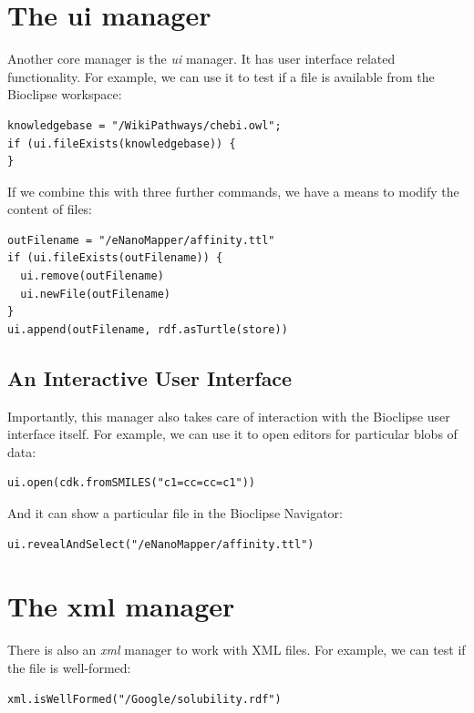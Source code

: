 \documentclass[a5paper, 10pt]{memoir}
\begin{document}
\begin{refsection}
\section{The ui manager}

Another core manager is the \emph{ui} manager. It has user interface related
functionality. For example, we can use it to test if a file is available from
the Bioclipse workspace:

\begin{Verbatim}
knowledgebase = "/WikiPathways/chebi.owl";
if (ui.fileExists(knowledgebase)) {
}
\end{Verbatim}

If we combine this with three further commands, we have a means to modify the
content of files:
\begin{Verbatim}
outFilename = "/eNanoMapper/affinity.ttl"
if (ui.fileExists(outFilename)) {
  ui.remove(outFilename)
  ui.newFile(outFilename)
}
ui.append(outFilename, rdf.asTurtle(store))
\end{Verbatim}

\subsection{An Interactive User Interface}

Importantly, this manager also takes care of interaction with the Bioclipse
user interface itself. For example, we can use it to open editors for
particular blobs of data:

\begin{Verbatim}
ui.open(cdk.fromSMILES("c1=cc=cc=c1"))
\end{Verbatim}

And it can show a particular file in the Bioclipse Navigator:
\begin{Verbatim}
ui.revealAndSelect("/eNanoMapper/affinity.ttl")
\end{Verbatim}

\section{The xml manager}

There is also an \emph{xml} manager to work with XML files. For example, we can test if the
file is well-formed:
\begin{Verbatim}
xml.isWellFormed("/Google/solubility.rdf")
\end{Verbatim}


\end{refsection}
\end{document}
